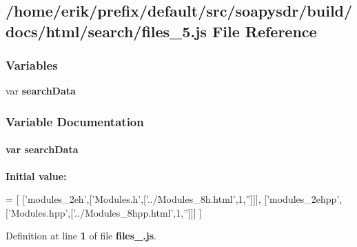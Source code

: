 \subsection{/home/erik/prefix/default/src/soapysdr/build/docs/html/search/files\+\_\+5.js File Reference}
\label{files__5_8js}
\subsubsection*{Variables}
\begin{DoxyCompactItemize}
\item 
var {\bf search\+Data}
\end{DoxyCompactItemize}


\subsubsection{Variable Documentation}
\paragraph[{search\+Data}]{\setlength{\rightskip}{0pt plus 5cm}var search\+Data}\label{files__5_8js_ad01a7523f103d6242ef9b0451861231e}
{\bfseries Initial value\+:}
\begin{DoxyCode}
=
[
  [\textcolor{stringliteral}{'modules\_2eh'},[\textcolor{stringliteral}{'Modules.h'},[\textcolor{stringliteral}{'../Modules\_8h.html'},1,\textcolor{stringliteral}{''}]]],
  [\textcolor{stringliteral}{'modules\_2ehpp'},[\textcolor{stringliteral}{'Modules.hpp'},[\textcolor{stringliteral}{'../Modules\_8hpp.html'},1,\textcolor{stringliteral}{''}]]]
]
\end{DoxyCode}


Definition at line {\bf 1} of file {\bf files\+\_.\+js}.

